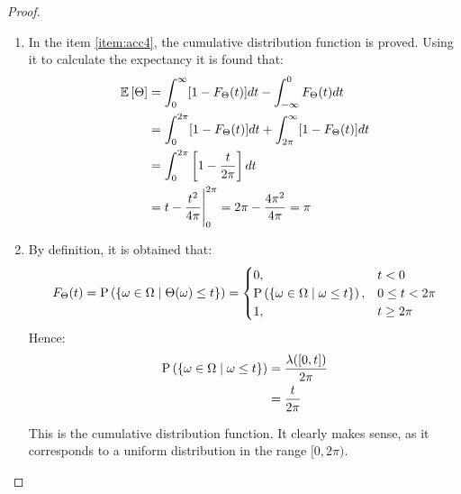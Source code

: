 \documentclass[11pt]{article}
\theoremstyle{definition}
\theoremstyle{remark}
\theoremstyle{remark}
\begin{document}
\begin{proof}
\begin{enumerate}[label=\alph*)]
    \item In the item \ref{item:acc4}, the cumulative distribution function is
      proved. Using it to calculate the expectancy it is found that:
      \begin{align*}
        \E{\Theta} &= \int_0^\infty [1 - F_\Theta(t)] dt -
                     \int_{-\infty}^0 F_\Theta(t) dt \\
                   &= \int_0^{2\pi} [1 - F_\Theta(t)] dt
                     + \int_{2\pi}^\infty [1 - F_\Theta(t)]dt \\
                   &= \int_0^{2\pi} \left[1 - \frac{t}{2\pi}\right]dt \\
                   &= t - \frac{t^2}{4\pi} \Bigg\rvert_0^{2\pi} =
                     2\pi - \frac{4\pi^2}{4\pi} = \pi
      \end{align*}

    \item \label{item:acc4} By definition, it is obtained that:
      \begin{equation*}
        F_\Theta(t) = \P{\{\omega \in \Omega \mid \Theta(\omega) \le t\}}
        =
        \begin{cases}
          0, &t < 0 \\
          \P{\{\omega \in \Omega \mid \omega \le t\}}, &0 \le t < 2\pi \\
          1, &t \ge 2\pi
        \end{cases}
      \end{equation*}
      Hence:
      \begin{align*}
        \P{\{\omega \in \Omega \mid \omega \le t\}} &= \frac{\lambda([0, t])}{2\pi} \\
                                                    &= \frac{t}{2\pi}
      \end{align*}

      This is the cumulative distribution function. It clearly makes
      sense, as it corresponds to a uniform distribution in the range
      $[0, 2\pi)$.


\end{enumerate}
\end{proof}
\end{document}
